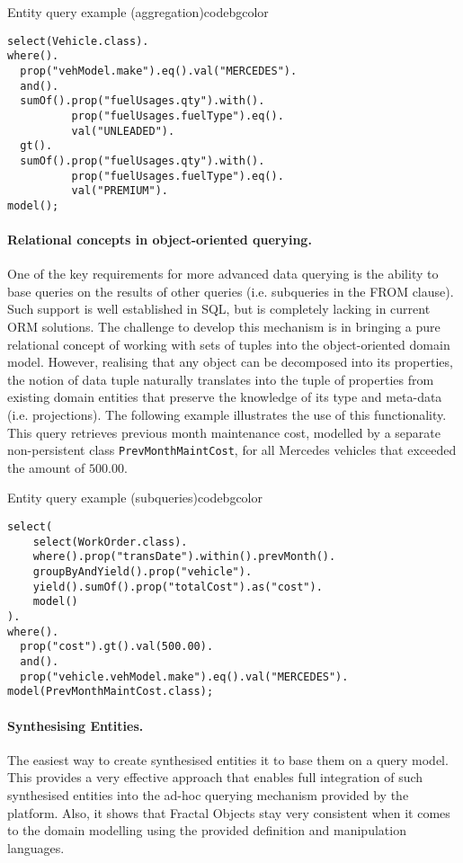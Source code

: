   \begin{code}{Entity query example (aggregation)}{\label{lst:eql1}}{codebgcolor}
    \begin{lstlisting}
select(Vehicle.class).
where().
  prop("vehModel.make").eq().val("MERCEDES").
  and().
  sumOf().prop("fuelUsages.qty").with().
          prop("fuelUsages.fuelType").eq().
          val("UNLEADED").
  gt().
  sumOf().prop("fuelUsages.qty").with().
          prop("fuelUsages.fuelType").eq().
          val("PREMIUM").
model();
    \end{lstlisting}
   \end{code}

\paragraph{Relational concepts in object-oriented querying.}

  One of the key requirements for more advanced data querying is the ability to base queries on the results of other queries (i.e. subqueries in the FROM clause).
  Such support is well established in SQL, but is completely lacking in current ORM solutions.
  The challenge to develop this mechanism is in bringing a pure relational concept of working with sets of tuples into the object-oriented domain model.
  However, realising that any object can be decomposed into its properties, the notion of data tuple naturally translates into the tuple of properties from existing domain entities that preserve the knowledge of its type and meta-data (i.e. projections).
  The following example illustrates the use of this functionality.
  This query retrieves previous month maintenance cost, modelled by a separate non-persistent class \texttt{PrevMonthMaintCost}, for all Mercedes vehicles that exceeded the amount of $500.00$.
  
  \begin{code}{Entity query example (subqueries)}{\label{lst:eql2}}{codebgcolor}
    \begin{lstlisting}[numbersep=10pt]
select(
    select(WorkOrder.class).
    where().prop("transDate").within().prevMonth().
    groupByAndYield().prop("vehicle").
    yield().sumOf().prop("totalCost").as("cost").
    model()  
).
where().
  prop("cost").gt().val(500.00).
  and().
  prop("vehicle.vehModel.make").eq().val("MERCEDES").
model(PrevMonthMaintCost.class);
    \end{lstlisting}
   \end{code}  

\paragraph{Synthesising Entities.}
  The easiest way to create synthesised entities it to base them on a query model.
  This provides a very effective approach that enables full integration of such synthesised entities into the ad-hoc querying mechanism provided by the platform.
  Also, it shows that Fractal Objects stay very consistent when it comes to the domain modelling using the provided definition and manipulation languages.

